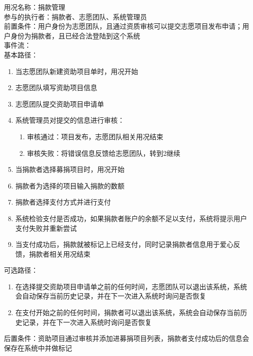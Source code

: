 
\begin{framed}
\noindent
用况名称：捐款管理\\
参与的执行者：捐款者、志愿团队、系统管理员\\
前置条件：用户身份为志愿团队，且通过资质审核可以提交志愿项目发布申请；用户身份为捐款者，且已经合法登陆到这个系统\\
事件流：\\
基本路径：
\begin{enumerate}[itemsep=2pt,topsep=0pt,parsep=0pt,itemindent=1em]
    \item 当志愿团队新建资助项目单时，用况开始
    \item 志愿团队填写资助项目信息
    \item 志愿团队提交资助项目申请单
    \item 系统管理员对提交的信息进行审核：
    \begin{enumerate}[itemsep=2pt,topsep=0pt,parsep=0pt,itemindent=1em]
          \item 审核通过：项目发布，志愿团队相关用况结束
          \item 审核失败：将错误信息反馈给志愿团队，转到2继续
      \end{enumerate}
    \item 当捐款者选择募捐项目时，用况开始
    \item 捐款者为选择的项目输入捐款的数额
    \item 捐款者选择支付方式并进行支付
    \item 系统检验支付是否成功，如果捐款者账户的余额不足以支付，系统将提示用户支付失败并重新尝试
    \item 当支付成功后，捐款就被标记上已经支付，同时记录捐款者信息用于爱心反馈，捐款者相关用况结束
\end{enumerate}
\noindent
可选路径：\par
     \begin{enumerate}[itemsep=2pt,topsep=0pt,parsep=0pt,itemindent=1em]  \item 在选择提交资助项目申请单之前的任何时间，志愿团队可以退出该系统，系统会自动保存当前历史记录，并在下一次进入系统时询问是否恢复 \item 在支付开始之前的任何时间，捐款者可以退出该系统，系统会自动保存当前历史记录，并在下一次进入系统时询问是否恢复  \end{enumerate} 
后置条件：资助项目通过审核并添加进募捐项目列表，捐款者支付成功后的信息会保存在系统中并做标记
\end{framed}

